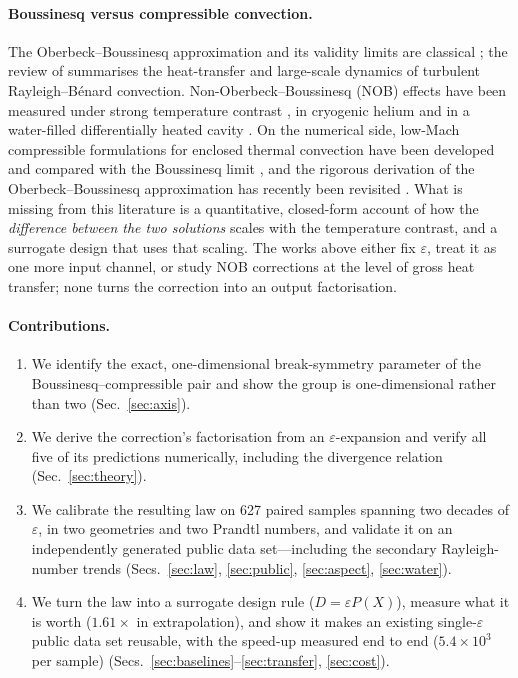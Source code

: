 \documentclass[11pt,a4paper]{article}
\begin{document}
\paragraph{Boussinesq versus compressible convection.} The Oberbeck--Boussinesq approximation and
its validity limits are classical \citep{spiegel1960boussinesq,gray1976validity}; the review of
\citet{ahlers2009heat} summarises the heat-transfer and large-scale dynamics of turbulent
Rayleigh--B\'enard convection. Non-Oberbeck--Boussinesq (NOB) effects have been measured under
strong temperature contrast \citep{yik2020turbulent}, in cryogenic helium \citep{macek2023assessing}
and in a water-filled differentially heated cavity \citep{pan2023non}. On the numerical side,
low-Mach compressible formulations for enclosed thermal convection have been developed and compared
with the Boussinesq limit \citep{zhang2023investigation,satake2024mathematical}, and the rigorous
derivation of the Oberbeck--Boussinesq approximation has recently been revisited
\citep{bella2023rigorous}. What is missing from this literature is a quantitative, closed-form
account of how the \emph{difference between the two solutions} scales with the temperature contrast,
and a surrogate design that uses that scaling. The works above either fix $\varepsilon$, treat it as
one more input channel, or study NOB corrections at the level of gross heat transfer; none turns the
correction into an output factorisation.

\paragraph{Contributions.}
\begin{enumerate}
\item We identify the exact, one-dimensional break-symmetry parameter of the
Boussinesq--compressible pair and show the group is one-dimensional rather than two
(Sec.~\ref{sec:axis}).
\item We derive the correction's factorisation from an $\varepsilon$-expansion and verify all five
of its predictions numerically, including the divergence relation (Sec.~\ref{sec:theory}).
\item We calibrate the resulting law on 627 paired samples spanning two decades of $\varepsilon$, in
two geometries and two Prandtl numbers, and validate it on an independently generated public data
set---including the secondary Rayleigh-number trends (Secs.~\ref{sec:law}, \ref{sec:public},
\ref{sec:aspect}, \ref{sec:water}).
\item We turn the law into a surrogate design rule ($D=\varepsilon P(X)$), measure what it is worth
($1.61\times$ in extrapolation), and show it makes an existing single-$\varepsilon$ public data set
reusable, with the speed-up measured end to end ($5.4\times10^3$ per sample)
(Secs.~\ref{sec:baselines}--\ref{sec:transfer}, \ref{sec:cost}).
\end{enumerate}
\end{document}
